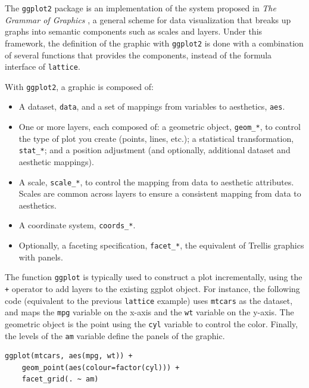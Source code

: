 \documentclass[smallroyalvopaper]{memoir}
\begin{document}

The \texttt{ggplot2} package \cite{Wickham2009} is an implementation of the system proposed in \emph{The Grammar of Graphics} \cite{Wilkinson1999}, a general scheme for data visualization that breaks up graphs into semantic components such as scales and layers. Under this framework, the definition of the graphic with \texttt{ggplot2} is done with a combination of several functions that provides the components, instead of the formula interface of
\texttt{lattice}.

With \texttt{ggplot2}, a graphic is composed of:

\begin{itemize}
\item A dataset, \texttt{data}, and a set of mappings from variables to aesthetics, \texttt{aes}.
\item One or more layers, each composed of: a geometric object, \texttt{geom\_*}, to control the type of plot you create (points, lines, etc.); a statistical transformation, \texttt{stat\_*}; and a position adjustment (and optionally, additional dataset and aesthetic mappings).
\item A scale, \texttt{scale\_*}, to control the mapping from data to aesthetic attributes. Scales are common across layers to ensure a consistent mapping from data to aesthetics.
\item A coordinate system, \texttt{coords\_*}.
\item Optionally, a faceting specification, \texttt{facet\_*}, the equivalent of Trellis graphics with panels.
\end{itemize}

The function \texttt{ggplot} is typically used to construct a plot incrementally, using the \texttt{+} operator to add layers to the existing ggplot object.  For instance, the following code (equivalent to the previous \texttt{lattice} example) uses \texttt{mtcars} as the dataset, and maps the \texttt{mpg} variable on the x-axis and the \texttt{wt} variable on the y-axis. The geometric object is the point using the \texttt{cyl} variable to control the color. Finally, the levels of the \texttt{am} variable define the panels of the graphic. 

\lstset{language=R,label= ,caption= ,captionpos=b,numbers=none}
\begin{lstlisting}
ggplot(mtcars, aes(mpg, wt)) +
    geom_point(aes(colour=factor(cyl))) +
    facet_grid(. ~ am)
\end{lstlisting}
\end{document}
